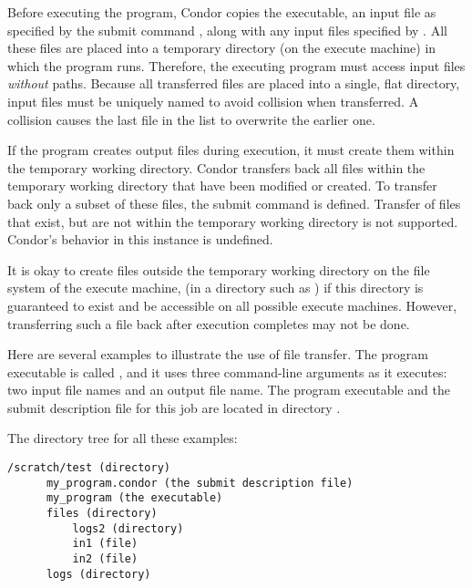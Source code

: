 Before executing the program, Condor copies the
executable, an input file as specified
by the submit command ,
along with any input files specified 
by .
All these files are placed into
a temporary directory (on the execute machine)
in which the program runs.
Therefore,
the executing program must access input files \emph{without} paths.
Because all transferred files are placed into a single,
flat directory,
input files must be uniquely named to
avoid collision when transferred.
A collision causes the last file in the list to
overwrite the earlier one.

If the program creates output files during execution,
it must create them within the temporary working directory.
Condor transfers back all files within the temporary
working directory that have been modified or created.
To transfer back only a subset of these files,
the submit command
is defined.
Transfer of files that exist,
but are not within the temporary working directory is not supported.
Condor's behavior in this instance is undefined.

It is
okay to create files outside the temporary working directory
on the file system of the execute machine,
(in a directory such as )
if this directory is guaranteed to exist and be
accessible on all possible execute machines.
However,
transferring such a file back after execution completes
may not be done.

Here are several examples to illustrate the use of file transfer.
The program executable is called ,
and it uses three command-line arguments as it executes: 
two input file names and an output file name.
The program executable and the submit description file 
for this job are located in directory
. 

The directory tree for all these examples:
\begin{verbatim}
/scratch/test (directory)
      my_program.condor (the submit description file)
      my_program (the executable)
      files (directory)
          logs2 (directory)
          in1 (file)
          in2 (file)
      logs (directory)
\end{verbatim}

